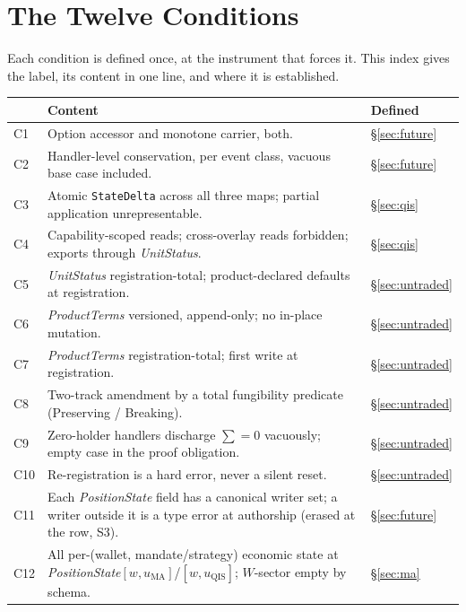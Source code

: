 \documentclass[11pt,a4paper]{article}
\begin{document}
\section{The Twelve Conditions}
\label{sec:conditions}

Each condition is defined once, at the instrument that forces it. This index gives the
label, its content in one line, and where it is established.

\begin{longtable}{p{1.2cm}p{10.6cm}p{1.8cm}}
\toprule
\textbf{} & \textbf{Content} & \textbf{Defined} \\
\midrule
C1 & Option accessor and monotone carrier, both. & \S\ref{sec:future} \\
C2 & Handler-level conservation, per event class, vacuous base case included. &
\S\ref{sec:future} \\
C3 & Atomic \texttt{StateDelta} across all three maps; partial application unrepresentable. &
\S\ref{sec:qis} \\
C4 & Capability-scoped reads; cross-overlay reads forbidden; exports through
\emph{UnitStatus}. & \S\ref{sec:qis} \\
C5 & \emph{UnitStatus} registration-total; product-declared defaults at registration. &
\S\ref{sec:untraded} \\
C6 & \emph{ProductTerms} versioned, append-only; no in-place mutation. &
\S\ref{sec:untraded} \\
C7 & \emph{ProductTerms} registration-total; first write at registration. &
\S\ref{sec:untraded} \\
C8 & Two-track amendment by a total fungibility predicate (Preserving / Breaking). &
\S\ref{sec:untraded} \\
C9 & Zero-holder handlers discharge $\sum=0$ vacuously; empty case in the proof obligation. &
\S\ref{sec:untraded} \\
C10 & Re-registration is a hard error, never a silent reset. & \S\ref{sec:untraded} \\
C11 & Each \emph{PositionState} field has a canonical writer set; a writer outside it is a
type error at authorship (erased at the row, S3). & \S\ref{sec:future} \\
C12 & All per-(wallet, mandate/strategy) economic state at
\emph{PositionState}$[w,u_{\mathrm{MA}}]$/$[w,u_{\mathrm{QIS}}]$; $W$-sector empty by schema. &
\S\ref{sec:ma} \\
\bottomrule
\end{longtable}
\end{document}
